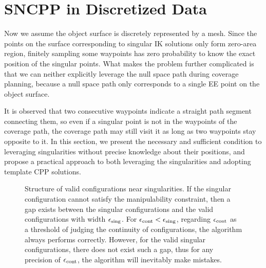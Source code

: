 \documentclass[Afour,sageh,times]{sagej}
\begin{document}
\section{SNCPP in Discretized Data}\label{section_discrete}
Now we assume the object surface is discretely represented by a mesh. 
Since the points on the surface corresponding to singular IK solutions only form zero-area region, finitely sampling some waypoints has zero probability to know the exact position of the singular points. 
What makes the problem further complicated is that we can neither explicitly leverage the null space path during coverage planning, because a null space path only corresponds to a single EE point on the object surface. 

It is observed that two consecutive waypoints indicate a straight path segment connecting them, so even if a singular point is not in the waypoints of the coverage path, the coverage path may still visit it as long as two waypoints stay opposite to it. 
In this section, we present the necessary and sufficient condition to leveraging singularities without precise knowledge about their positions, and propose a practical approach to both leveraging the singularities and adopting template CPP solutions. 

\begin{figure}[t]
\centering
{}
\caption{Structure of valid configurations near singularities. If the singular configuration cannot satisfy the manipulability constraint, then a gap exists between the singular configurations and the valid configurations with width $\epsilon_{\rm sing}$. For $\epsilon_{\rm cont} < \epsilon_{\rm sing}$, regarding $\epsilon_{\rm cont}$ as a threshold of judging the continuity of configurations, the algorithm always performs correctly. However, for the valid singular configurations, there does not exist such a gap, thus for any precision of $\epsilon_{\rm cont}$, the algorithm will inevitably make mistakes.
}\label{fig:gap}
\end{figure}
\end{document}
